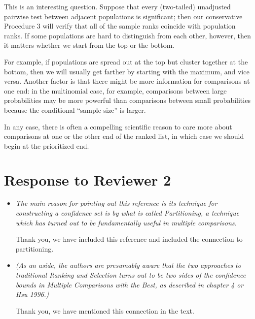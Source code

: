 \documentclass[]{article}
\theoremstyle{remark}
\begin{document}
\begin{itemize}
This is an interesting question. Suppose that every (two-tailed) unadjusted pairwise test between adjacent populations is significant; then our conservative Procedure 3 will verify that all of the sample ranks coincide with population ranks. If some populations are hard to distinguish from each other, however, then it matters whether we start from the top or the bottom.

For example, if populations are spread out at the top but cluster together at the bottom, then we will usually get farther by starting with the maximum, and vice versa. Another factor is that there might be more information for comparisons at one end: in the multinomial case, for example, comparisons between large probabilities may be more powerful than comparisons between small probabilities because the conditional ``sample size'' is larger.

In any case, there is often a compelling scientific reason to care more about comparisons at one or the other end of the ranked list, in which case we should begin at the prioritized end.


\end{itemize}

\section{Response to Reviewer 2}

\begin{itemize}

\item {\em The main reason for pointing out this reference is its technique for constructing a confidence set is by what is called Partitioning, a technique which has turned out to be fundamentally useful in multiple comparisons.}

Thank you, we have included this reference and included the connection to partitioning. 

\item {\em (As an aside, the authors are presumably aware that the two approaches to traditional Ranking and Selection turns out to be two sides of the confidence bounds in Multiple Comparisons with the Best, as described in chapter 4 or Hsu 1996.)}

Thank you, we have mentioned this connection in the text.

\end{itemize}



\end{document}
